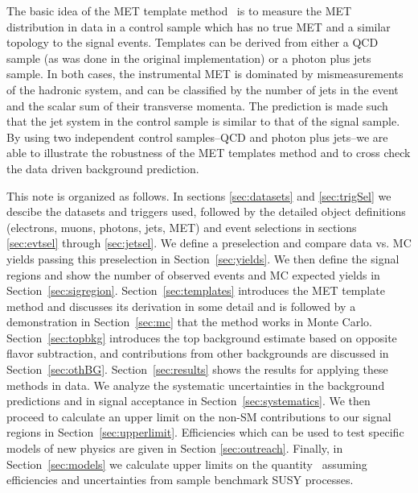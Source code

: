 The basic idea of the MET template method~\cite{ref:templates1}\cite{ref:templates2} is 
to measure the MET distribution in data in a control sample which has no true MET 
and a similar topology to the signal events. 
Templates can be derived from either a QCD sample (as was done in the original implementation) 
or a photon plus jets sample.
In both cases, the instrumental MET is dominated by mismeasurements of the hadronic system,
and can be classified by the number of jets in the event and the scalar sum of their transverse
momenta.
The prediction is made such that the jet system in the control sample is similar to that of the
signal sample.
By using two independent control samples--QCD and photon plus jets--we are able to illustrate
the robustness of the MET templates method and to cross check the data driven background 
prediction.

This note is organized as follows. 
In sections \ref{sec:datasets} and \ref{sec:trigSel} we descibe
the datasets and triggers used, followed by the detailed object definitions (electrons, muons, photons,
jets, MET) and event selections in sections \ref{sec:evtsel} through \ref{sec:jetsel}.
We define a preselection and compare data vs. MC yields passing this preselection in 
Section~\ref{sec:yields}.
We then define the signal regions and show the number of observed events and MC expected 
yields in Section~\ref{sec:sigregion}.
Section~\ref{sec:templates} introduces the MET template method and discusses its derivation 
in some detail and is followed by a demonstration in Section~\ref{sec:mc} 
that the method works in Monte Carlo.
Section~\ref{sec:topbkg} introduces the top background estimate based on opposite flavor subtraction, 
and contributions from other backgrounds are discussed in Section~\ref{sec:othBG}.
Section~\ref{sec:results} shows the results for applying these methods in data.
We analyze the systematic uncertainties in the background predictions and in signal acceptance
in Section~\ref{sec:systematics}. 
We then proceed to calculate an upper limit on the non-SM contributions to our signal regions 
in Section~\ref{sec:upperlimit}. 
Efficiencies which can be used to test specific models of new physics are given 
in Section \ref{sec:outreach}.
Finally, in Section~\ref{sec:models} we calculate upper limits on the quantity \sta\
assuming efficiencies and uncertainties from sample benchmark SUSY processes. 


